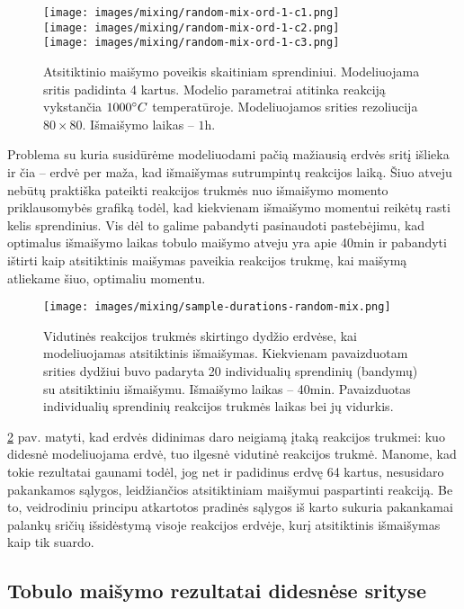 \begin{figure}[h!]
  \centering
  \texttt{[image: images/mixing/random-mix-ord-1-c1.png]} \\ 
  \texttt{[image: images/mixing/random-mix-ord-1-c2.png]} \\
  \texttt{[image: images/mixing/random-mix-ord-1-c3.png]}
  \caption{Atsitiktinio maišymo poveikis skaitiniam sprendiniui. Modeliuojama sritis padidinta 4 kartus. Modelio parametrai atitinka reakciją vykstančia $1000\degree C$ temperatūroje. Modeliuojamos srities rezoliucija $80\times80$. Išmaišymo laikas -- $1\text{h}. $}
  \label{fig:random-mix-larger-example}
\end{figure}

Problema su kuria susidūrėme modeliuodami pačią mažiausią erdvės sritį išlieka ir čia -- erdvė per maža, kad išmaišymas sutrumpintų reakcijos laiką. Šiuo atveju nebūtų praktiška pateikti reakcijos trukmės nuo išmaišymo momento priklausomybės grafiką todėl, kad kiekvienam išmaišymo momentui reikėtų rasti kelis sprendinius. Vis dėl to galime pabandyti pasinaudoti pastebėjimu, kad optimalus išmaišymo laikas tobulo maišymo atveju yra apie 40min ir pabandyti ištirti kaip atsitiktinis maišymas paveikia reakcijos trukmę, kai maišymą atliekame šiuo, optimaliu momentu. 

\begin{figure}[h!]
  \centering
  \texttt{[image: images/mixing/sample-durations-random-mix.png]}
  \caption{Vidutinės reakcijos trukmės skirtingo dydžio erdvėse, kai modeliuojamas atsitiktinis išmaišymas. Kiekvienam pavaizduotam srities dydžiui buvo padaryta 20 individualių sprendinių (bandymų) su atsitiktiniu išmaišymu. Išmaišymo laikas -- 40min. Pavaizduotas individualių sprendinių reakcijos trukmės laikas bei jų vidurkis.}
  \label{fig:random-samples}
\end{figure}

\ref{fig:random-samples} pav. matyti, kad erdvės didinimas daro neigiamą įtaką reakcijos trukmei: kuo didesnė modeliuojama erdvė, tuo ilgesnė vidutinė reakcijos trukmė. Manome, kad tokie rezultatai gaunami todėl, jog net ir padidinus erdvę 64 kartus, nesusidaro pakankamos sąlygos, leidžiančios atsitiktiniam maišymui paspartinti reakciją. Be to, veidrodiniu principu atkartotos pradinės sąlygos iš karto sukuria pakankamai palankų sričių išsidėstymą visoje reakcijos erdvėje, kurį atsitiktinis išmaišymas kaip tik suardo.

\subsection{Tobulo maišymo rezultatai didesnėse srityse}

